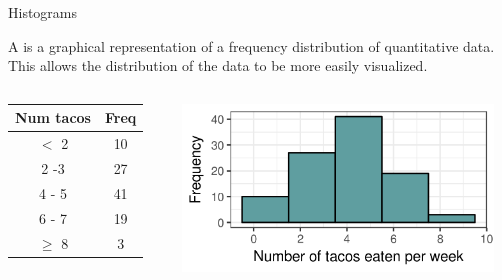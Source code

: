 \documentclass[xcolor=table, aspectratio=169, bigger, handout]{beamer}
\begin{document}
\begin{frame}{Histograms}
\begin{block}{}
A  is a graphical representation of a frequency distribution of quantitative data. This allows the distribution of the data to be more easily visualized.
\end{block}

\pause
\begin{columns}
\begin{column}{0.35\textwidth}
\begin{exampleblock}{}
\begin{center}
\begin{tabular}{cc}
Num tacos & Freq \\
\hline
 $<$ 2 & 10 \\
2 -3 & 27 \\
4 - 5 & 41 \\
6 - 7 & 19 \\
 $\ge$ 8& 3 \\
\end{tabular}
\end{center}
\end{exampleblock}
\end{column}

\begin{column}{0.65\textwidth}
\begin{center}
\includegraphics[width=3.25in]{../images/wk04_taco_hist}

\end{center}
\end{column}
\end{columns}

\end{frame}
\end{document}
